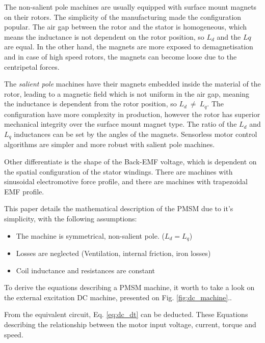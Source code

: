 \documentclass[twoside,b5paper,10pt]{article}
\begin{document}
The non-salient pole machines are usually equipped with surface mount magnets on their rotors. The simplicity of the manufacturing made the configuration popular. The air gap between the rotor and the stator is homogeneous, which means the inductance is not dependent on the rotor position, so  $L_d$ and the $Lq$ are equal. In the other hand, the magnets are more exposed to demagnetisation and in case of high speed rotors, the magnets can become loose due to the centripetal forces.



The \emph{salient pole} machines have their magnets embedded inside the material of the rotor, leading to a magnetic field which is not uniform in the air gap, meaning the inductance is dependent from the rotor position, so $L_d\ \ne{}\ L_q$. The configuration have more complexity in production, however the rotor has superior mechanical integrity over the surface mount magnet type. The ratio of the $L_d$ and $L_q$ inductances can be set by the angles of the magnets. Sensorless motor control algorithms are simpler and more robust with salient pole machines.

Other differentiate is the shape of the Back-EMF voltage, which is dependent on the spatial configuration of the stator windings. There are machines with sinusoidal electromotive force profile, and there are machines with trapezoidal EMF profile. \cite{veszpremi} \cite{springer_ac_drives}

This paper details the mathematical description of the PMSM due to it's simplicity, with the following assumptions:
\begin{itemize}
  \item The machine is symmetrical, non-salient pole. ($L_d = L_q$)
  \item Losses are neglected (Ventilation, internal friction, iron losses)
  \item Coil inductance and resistances are constant
\end{itemize}

To derive the equations describing a PMSM machine, it worth to take a look on the external excitation DC machine, presented on Fig. \ref{fig:dc_machine}..



From the equivalent circuit, Eq. \ref{eq:dc_dt} can be deducted. These Equations describing the relationship between the motor input voltage, current, torque and speed.
\end{document}
